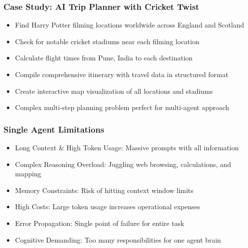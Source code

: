 \begin{frame}[fragile]\frametitle{Case Study: AI Trip Planner with Cricket Twist}
      \begin{itemize}
		\item Find Harry Potter filming locations worldwide across England and Scotland
		\item Check for notable cricket stadiums near each filming location
		\item Calculate flight times from Pune, India to each destination
		\item Compile comprehensive itinerary with travel data in structured format
		\item Create interactive map visualization of all locations and stadiums
		\item Complex multi-step planning problem perfect for multi-agent approach
	  \end{itemize}
\end{frame}

\begin{frame}[fragile]\frametitle{Single Agent Limitations}
      \begin{itemize}
		\item Long Context \& High Token Usage: Massive prompts with all information
		\item Complex Reasoning Overload: Juggling web browsing, calculations, and mapping
		\item Memory Constraints: Risk of hitting context window limits
		\item High Costs: Large token usage increases operational expenses
		\item Error Propagation: Single point of failure for entire task
		\item Cognitive Demanding: Too many responsibilities for one agent brain
	  \end{itemize}
\end{frame}

